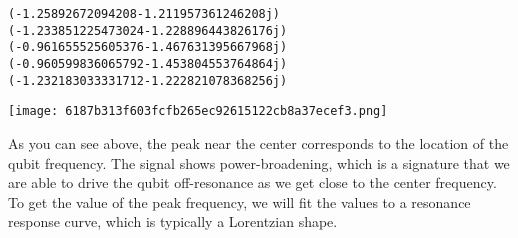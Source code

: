 \hypertarget{48cdd8c7-6fc2-4774-99ee-71b370de0ab0}{}
\begin{Shaded}
\begin{Highlighting}[]

\OperatorTok{=}\NormalTok{ []}
 \NormalTok{(}
\OperatorTok{=}\OperatorTok{*}
    \OperatorTok{\%}\OperatorTok{==}\NormalTok{): }\OperatorTok{*}\NormalTok{scale\_factor)[}\NormalTok{])}

\OperatorTok{=}\NormalTok{) }
\NormalTok{plt.xlim([}\NormalTok{(frequencies\_GHz)])}
\NormalTok{)}
\NormalTok{)}
\end{Highlighting}
\end{Shaded}

\begin{verbatim}
(-1.25892672094208-1.211957361246208j)
(-1.233851225473024-1.228896443826176j)
(-0.961655525605376-1.467631395667968j)
(-0.960599836065792-1.453804553764864j)
(-1.232183033331712-1.222821078368256j)
\end{verbatim}

\texttt{[image: 6187b313f603fcfb265ec92615122cb8a37ecef3.png]}

\leavevmode{}%
As you can see above, the peak near the center corresponds to the
location of the qubit frequency. The signal shows power-broadening,
which is a signature that we are able to drive the qubit off-resonance
as we get close to the center frequency. To get the value of the peak
frequency, we will fit the values to a resonance response curve, which
is typically a Lorentzian shape.

